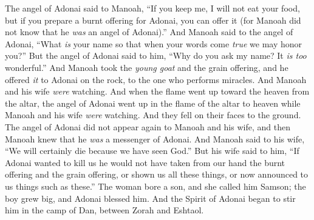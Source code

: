 \begin{biblechapter}
\verse The angel of Adonai said to Manoah, “If you keep me, I will not eat your food, but if you prepare a burnt offering for Adonai, you can offer it (for Manoah did not know that he \textit{was} an angel of Adonai).”
\verse And Manoah said to the angel of Adonai, “What \textit{is} your name so that when your words come \textit{true} we may honor you?”
\verse But the angel of Adonai said to him, “Why do you ask my name? It \textit{is too} wonderful.”
\verse And Manoah took the \textit{young goat} and the grain offering, and he offered \textit{it} to Adonai on the rock, to the one who performs miracles. And Manoah and his wife \textit{were} watching.
\verse And when the flame went up toward the heaven from the altar, the angel of Adonai went up in the flame of the altar to heaven while Manoah and his wife \textit{were} watching. And they fell on their faces to the ground.
\verse The angel of Adonai did not appear again to Manoah and his wife, and then Manoah knew that he \textit{was} a messenger of Adonai.
\verse And Manoah said to his wife, “We will certainly die because we have seen God.”
\verse But his wife said to him, “If Adonai wanted to kill us he would not have taken from our hand the burnt offering and the grain offering, or shown us all these things, or now announced to us things such as these.”
\verse The woman bore a son, and she called him Samson; the boy grew big, and Adonai blessed him.
\verse And the Spirit of Adonai began to stir him in the camp of Dan, between Zorah and Eshtaol.
\end{biblechapter}

